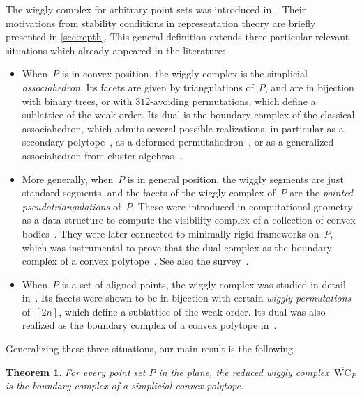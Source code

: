 \documentclass{amsart}
\newtheorem{theorem}{Theorem}%
\theoremstyle{definition}
\newcommand{\darkblue}{\color{darkblue}} %
\newcommand{\defn}[1]{\textsl{\darkblue #1}} %
\newcommand{\reducedWigglyComplex}{\overline{\mathrm{WC}}} %
\begin{document}
The wiggly complex for arbitrary point sets was introduced in~\cite{BapatDeopurkarLicata}.
Their motivations from stability conditions in representation theory are briefly presented in \cref{sec:repth}.
This general definition extends three particular relevant situations which already appeared in the literature:
\begin{itemize}
\item  When~$P$ is in convex position, the wiggly complex is the simplicial \defn{associahedron}.
Its facets are given by triangulations of~$P$, and are in bijection with binary trees, or with $312$-avoiding permutations, which define a sublattice of the weak order.
Its dual is the boundary complex of the classical associahedron, which admits several possible realizations, in particular as a secondary polytope~\cite{GelfandKapranovZelevinsky,BilleraSturmfels,DeLoeraRambauSantos}, as a deformed permutahedron~\cite{Loday,PilaudSantos-quotientopes,PilaudSantosZiegler}, or as a generalized associahedron from cluster algebras~\cite{ChapotonFominZelevinsky,HohlwegPilaudStella}.

\item More generally, when~$P$ is in general position, the wiggly segments are just standard segments, and the facets of the wiggly complex of~$P$ are the \defn{pointed pseudotriangulations} of~$P$.
These were introduced in computational geometry as a data structure to compute the visibility complex of a collection of convex bodies~\cite{PocchiolaVegter}.
They were later connected to minimally rigid frameworks on~$P$, which was instrumental to prove that the dual complex as the boundary complex of a convex polytope~\cite{RoteSantosStreinu-polytope}.
See also the survey~\cite{RoteSantosStreinu-pseudotriangulations}.

\item When~$P$ is a set of aligned points, the wiggly complex was studied in detail in~\cite{BapatPilaud-wigglyaligned}.
Its facets were shown to be in bijection with certain \defn{wiggly permutations} of~$[2n]$, which define a sublattice of the weak order.
Its dual was also realized as the boundary complex of a convex polytope in~\cite{BapatPilaud-wigglyaligned}.
\end{itemize}

Generalizing these three situations, our main result is the following.

\begin{theorem}
For every point set $P$ in the plane, the reduced wiggly complex~$\reducedWigglyComplex_P$ is the boundary complex of a simplicial convex polytope.
\end{theorem}
\end{document}

